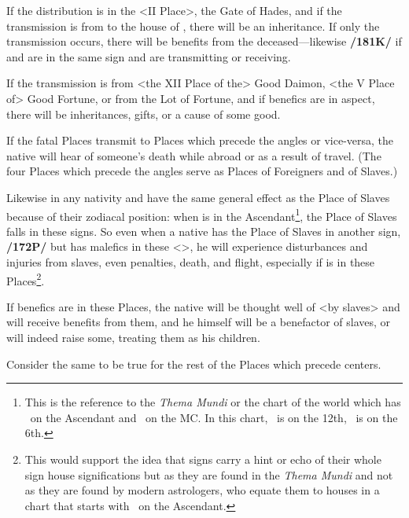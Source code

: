 If the distribution is in the <II Place>, the Gate of Hades, and if the transmission is from \Saturn\xspace to the house of \Jupiter, there will be an inheritance. If only
the transmission occurs, there will be benefits from the deceased—likewise \textbf{/181K/} if \Saturn\xspace and \Jupiter\xspace are in the same sign and are transmitting or receiving.

If the transmission is from <the XII Place of the> Good Daimon, <the V Place of> Good Fortune, or from the Lot of Fortune, and if benefics are in aspect, there will be inheritances, gifts, or a cause of some good. 

If the fatal Places transmit to Places which precede the angles or vice-versa, the native will hear of someone’s death while abroad or as a result of travel. (The four Places which precede the angles serve as Places of Foreigners and of Slaves.)

 Likewise in any nativity \Gemini\xspace and \Sagittarius\xspace have the same general effect as the Place of Slaves because of their zodiacal position: when \Cancer\xspace is in the Ascendant\footnote{This is the reference to the \textsl{Thema Mundi} or the chart of the world which has \Cancer\, on the Ascendant and \Aries\, on the MC. In this chart, \Gemini\, is on the 12th, \Sagittarius\, is on the 6th.}, the Place of Slaves falls in these signs. So even when a native has the Place of Slaves in another sign, \textbf{/172P/} but has malefics in these <\Gemini\xspace [or] \Sagittarius>, he will experience disturbances and injuries from slaves, even penalties, death, and flight, especially if \Saturn\xspace is in these Places\footnote{This would support the idea that signs carry a hint or echo of their whole sign house significations but as they are found in the \textsl{Thema Mundi} and not as they are found by modern astrologers, who equate them to houses in a chart that starts with \Aries\, on the Ascendant.}. 
 
 If benefics are in these Places, the native will be thought well of <by slaves> and will receive benefits from them, and he himself will be a benefactor of slaves, or will indeed raise some, treating them as his children.
 
Consider the same to be true for the rest of the Places which precede centers.

\newpage